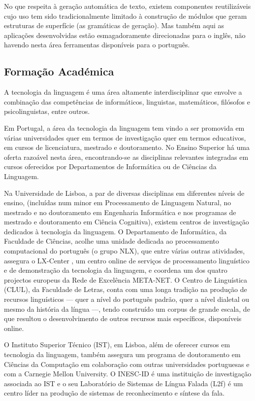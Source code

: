 \begin{multicols}{2}
No que respeita à geração automática de texto, existem componentes reutilizáveis cujo 
uso tem sido tradicionalmente limitado à construção de módulos que geram estruturas de superfície 
(as gramáticas de geração).  Mas também aqui as aplicações desenvolvidas estão 
esmagadoramente direcionadas para o inglês, não havendo nesta área ferramentas disponíveis 
para o português.


\subsection{Formação Académica}

A tecnologia da linguagem é uma área altamente interdisciplinar que envolve a combinação
das competências de informáticos, linguistas, matemáticos, filósofos e psicolinguistas, entre outros. 

Em Portugal, a área da tecnologia da linguagem tem vindo a ser promovida em várias universidades quer em termos de investigação quer em termos educativos, em cursos de licenciatura, mestrado e doutoramento. 
No  Ensino Superior há uma oferta razoável nesta área, encontrando-se as disciplinas relevantes integradas em cursos oferecidos por Departamentos de Informática ou de Ciências da Linguagem.

Na Universidade de Lisboa, a par de diversas disciplinas em diferentes níveis de ensino,
(incluídas num minor em Processamento de Linguagem Natural,
no mestrado e no doutoramento em Engenharia Informática 
e nos programas de mestrado e doutoramento em Ciência Cognitiva), 
existem centros de investigação dedicados à tecnologia da linguagem. 
O Departamento de Informática, da Faculdade de Ciências, acolhe uma unidade dedicada ao processamento computacional do português (o grupo NLX), 
que entre várias outras atividades, assegura o LX-Center \cite{lxcenter}, 
um centro online de serviços de processamento linguístico e de demonstração da tecnologia da linguagem,
e coordena um dos quatro projectos europeus da Rede de Excelência META-NET. 
O Centro de Linguística (CLUL), da Faculdade de Letras, conta com uma longa tradição na produção de recursos linguísticos 
--- quer a nível do português padrão, quer a nível dialetal ou mesmo da história da língua ---, 
tendo construído um corpus de grande escala, de que resultou o desenvolvimento de outros recursos mais específicos, 
disponíveis online.

O Instituto Superior Técnico (IST), em Lisboa, além de oferecer cursos em tecnologia da linguagem, 
também assegura um programa de doutoramento em Ciências da Computação em colaboração com outras universidades 
portuguesas e com a Carnegie Mellon University. 
O INESC-ID é uma instituição de investigação associada ao IST e o seu Laboratório de Sistemas de Língua Falada (L2f) 
é um centro líder na produção de sistemas de reconhecimento e síntese da fala.


\end{multicols}
